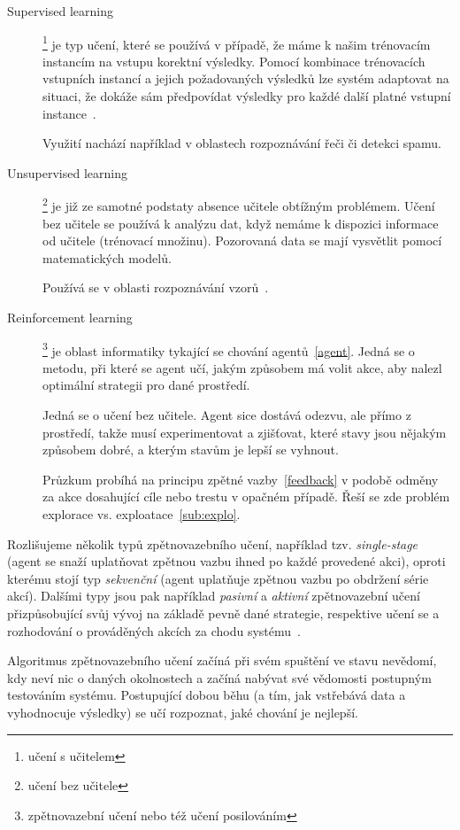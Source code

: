 \documentclass[thesis=M,czech]{FITthesis}[2014/05/07]
\begin{document}
\begin{description}
  \item[Supervised learning]\footnote{učení s učitelem} je typ učení, které se používá v případě, že máme k našim trénovacím instancím na vstupu korektní výsledky. Pomocí kombinace trénovacích vstupních instancí a jejich požadovaných výsledků lze systém adaptovat na situaci, že dokáže sám předpovídat výsledky pro každé další platné vstupní instance~\cite{aihorizon}.
  
  Využití nachází například v oblastech rozpoznávání řeči či detekci spamu.
  \item[Unsupervised learning]\footnote{učení bez učitele} je již ze samotné podstaty absence učitele obtížným problémem. Učení bez učitele se používá k analýzu dat, když nemáme k dispozici informace od učitele (trénovací množinu). Pozorovaná data se mají vysvětlit pomocí matematických modelů.
  
  Používá se v oblasti rozpoznávání vzorů~\cite{hlavac}.
  \item[Reinforcement learning]\footnote{zpětnovazební učení nebo též učení posilováním} je oblast informatiky tykající se chování agentů~\ref{agent}. Jedná se o metodu, při které se agent učí, jakým způsobem má volit akce, aby nalezl optimální strategii pro dané prostředí.
  
  Jedná se o učení bez učitele. Agent sice dostává odezvu, ale přímo z prostředí, takže musí experimentovat a zjišťovat, které stavy jsou nějakým způsobem dobré, a kterým stavům je lepší se vyhnout.
  
  Průzkum probíhá na principu zpětné vazby~\ref{feedback} v podobě odměny za akce dosahující cíle nebo trestu v opačném případě. Řeší se zde problém explorace vs. exploatace~\ref{sub:explo}. 
\end{description}

Rozlišujeme několik typů zpětnovazebního učení, například tzv. \emph{single-stage} (agent se snaží uplatňovat zpětnou vazbu ihned po každé provedené akci), oproti kterému stojí typ \emph{sekvenční} (agent uplatňuje zpětnou vazbu po obdržení série akcí). Dalšími typy jsou pak například \emph{pasivní} a \emph{aktivní} zpětnovazební učení přizpůsobující svůj vývoj na základě pevně dané strategie, respektive učení se a rozhodování o prováděných akcích za chodu systému~\cite{reinforcement}.

Algoritmus zpětnovazebního učení začíná při svém spuštění ve stavu nevědomí, kdy neví nic o daných okolnostech a začíná nabývat své vědomosti postupným testováním systému. Postupující dobou běhu (a tím, jak vstřebává data a vyhodnocuje výsledky) se učí rozpoznat, jaké chování je nejlepší.
\end{document}
